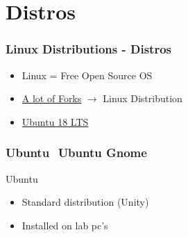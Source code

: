 \begin{frame}
	
\end{frame}

\section{Distros}
\begin{frame}
	\frametitle{Linux Distributions - Distros}

	\begin{itemize}
		\item Linux = Free Open Source OS
        \item \href{https://upload.wikimedia.org/wikipedia/commons/1/1b/Linux_Distribution_Timeline.svg}{A lot of Forks} $\rightarrow$ Linux Distribution
	\end{itemize}
    \begin{itemize}
        \item \hyperlink{ubuntu}{Ubuntu 18 LTS}
	\end{itemize}
\end{frame}

\begin{frame}[label=ubuntu]
	\frametitle{Ubuntu $ $ Ubuntu Gnome}
    Ubuntu
	\begin{itemize}
		\item Standard distribution (Unity)
		\item Installed on lab pc's
	\end{itemize}
    
\end{frame}

